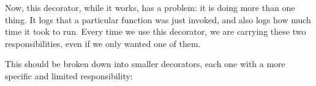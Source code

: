 \documentclass[a4paper,10pt,english]{sphinxmanual}
\begin{document}
\begin{sphinxVerbatim}[commandchars=\\\{\}]
 

      
         
          
           
              
         

     
\end{sphinxVerbatim}

Now, this decorator, while it works, has a problem: it is doing more than one thing. It logs
that a particular function was just invoked, and also logs how much time it took to run.
Every time we use this decorator, we are carrying these two responsibilities, even if we only
wanted one of them.

This should be broken down into smaller decorators, each one with a more specific and
limited responsibility:
\end{document}
